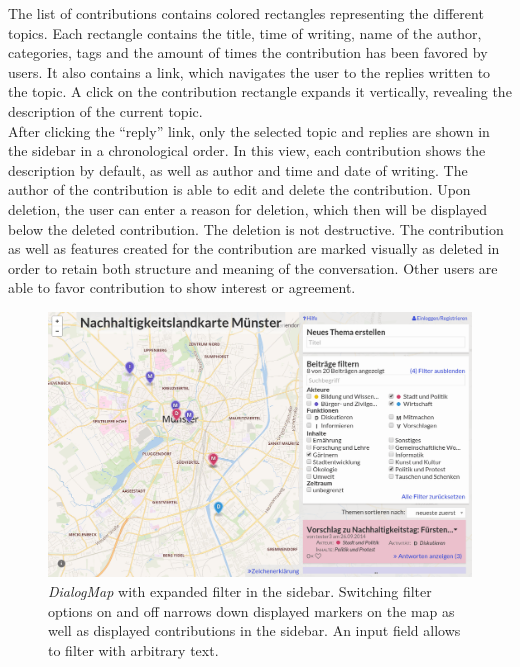 The list of contributions contains colored rectangles representing the different topics. Each rectangle contains the title, time of writing, name of the author, categories, tags and the amount of times the contribution has been favored by users. It also contains a link, which navigates the user to the replies written to the topic. A click on the contribution rectangle expands it vertically, revealing the description of the current topic.\\
After clicking the ``reply'' link, only the selected topic and replies are shown in the sidebar in a chronological order. In this view, each contribution shows the description by default, as well as author and time and date of writing. The author of the contribution is able to edit and delete the contribution. Upon deletion, the user can enter a reason for deletion, which then will be displayed below the deleted contribution. The deletion is not destructive. The contribution as well as features created for the contribution are marked visually as deleted in order to retain both structure and meaning of the conversation. Other users are able to favor contribution to show interest or agreement.

\begin{figure}[!h]
    \centering
    \includegraphics[width=1\columnwidth]{images/screenshot_filters}
    \caption{\textit{DialogMap} with expanded filter in the sidebar. Switching filter options on and off narrows down displayed markers on the map as well as displayed contributions in the sidebar. An input field allows to filter with arbitrary text.}
    \label{fig:screenshot_filter}
\end{figure}

